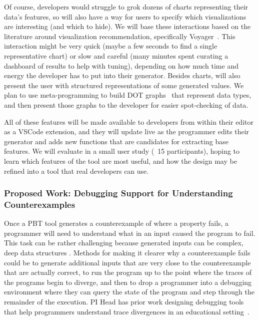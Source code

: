 Of course, developers would struggle to grok dozens of charts representing
their data's features, so \genvis{} will also have a way for users to specify
which visualizations are interesting (and which to hide). We will base these
interactions based on the literature around visualization recommendation,
specifically Voyager~\cite{wongsuphasawat_voyager_2016,
wongsuphasawat_voyager_2017}. This interaction might be very quick (maybe a few
seconds to find a single representative chart) or slow and careful (many minutes
spent curating a dashboard of results to help with tuning), depending on how
much time and energy the developer has to put into their generator. Besides
charts, \genvis{} will also present the user with structured representations of
some generated values. We plan to use meta-programming to build
DOT graphs~\cite{ellson_graphviz_2002} that represent data types, and then
present those graphs to the developer for easier spot-checking of data.

All of these features will be made available to developers from within their
editor as a VSCode extension, and they will update live as the programmer edits
their generator and adds new functions that are candidates for extracting base
features. We will evaluate \genvis{} in a small user study (~15 participants),
hoping to learn which features of the tool are most useful, and how the design
may be refined into a tool that real developers can use.

\subsubsection{Proposed Work: Debugging Support for Understanding Counterexamples}

Once a PBT tool generates a counterexample of where a property fails, a
programmer will need to understand what in an input caused the program to fail.
This task can be rather challenging because generated inputs can be complex,
deep data structures . Methods for making it clearer why a counterexample
fails could be to generate additional inputs that are very close to the
counterexample that are actually correct, to run the program up to the point
where the traces of the programs begin to diverge, and then to drop a programmer
into a debugging environment where they can query the state of the program and
step through the remainder of the execution. PI Head has prior work designing
debugging tools that help programmers understand trace divergences in an
educational setting~\cite{suzuki2017tracediff}.   

